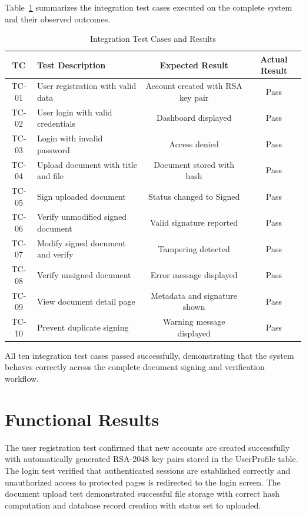 Table~\ref{tab:testcases} summarizes the integration test cases executed on the complete system and their observed outcomes.

\begin{table}[H]
\centering
\caption{Integration Test Cases and Results}
\label{tab:testcases}
\begin{tabularx}{\textwidth}{|c|X|c|c|}
\hline
\textbf{TC} & \textbf{Test Description} & \textbf{Expected Result} & \textbf{Actual Result} \\
\hline
TC-01 & User registration with valid data & Account created with RSA key pair & Pass \\
\hline
TC-02 & User login with valid credentials & Dashboard displayed & Pass \\
\hline
TC-03 & Login with invalid password & Access denied & Pass \\
\hline
TC-04 & Upload document with title and file & Document stored with hash & Pass \\
\hline
TC-05 & Sign uploaded document & Status changed to Signed & Pass \\
\hline
TC-06 & Verify unmodified signed document & Valid signature reported & Pass \\
\hline
TC-07 & Modify signed document and verify & Tampering detected & Pass \\
\hline
TC-08 & Verify unsigned document & Error message displayed & Pass \\
\hline
TC-09 & View document detail page & Metadata and signature shown & Pass \\
\hline
TC-10 & Prevent duplicate signing & Warning message displayed & Pass \\
\hline
\end{tabularx}
\end{table}

All ten integration test cases passed successfully, demonstrating that the system behaves correctly across the complete document signing and verification workflow.

\section{Functional Results}

The user registration test confirmed that new accounts are created successfully with automatically generated RSA-2048 key pairs stored in the UserProfile table. The login test verified that authenticated sessions are established correctly and unauthorized access to protected pages is redirected to the login screen. The document upload test demonstrated successful file storage with correct hash computation and database record creation with status set to uploaded.

